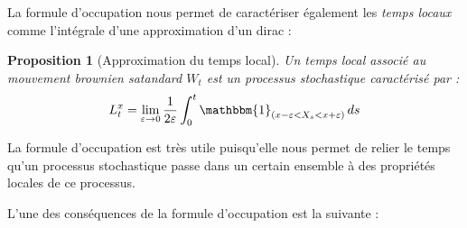 \documentclass[openany]{book}
\newcommand{\1}{\mathbbm{1}}
\theoremstyle{thmfont}
\theoremstyle{deffont}
\theoremstyle{thmfont}
\newtheorem{prop}[prop]{Proposition}
\theoremstyle{deffont}
\newtheorem*{remark}{Remarque}
\begin{document}
La formule d'occupation nous permet de caractériser également les \textit{temps locaux} comme l'intégrale d'une approximation d'un dirac :

\begin{prop}[Approximation du temps local]
  \label{prop:caractTempsLoc}
  Un \textit{temps local} associé au mouvement brownien satandard $W_t$ est un processus stochastique caractérisé par :
\begin{equation*}
  L_t^x = \lim_{\varepsilon \to 0} \frac{1}{2\varepsilon} \int_0^t \1_{(x - \varepsilon < X_s < x + \varepsilon)} \, ds
\end{equation*}
\end{prop}


La formule d'occupation est très utile puisqu'elle nous permet de relier le temps qu’un processus stochastique passe dans un certain ensemble à des propriétés locales de ce processus.

L'une des conséquences de la formule d'occupation est la suivante :
\end{document}
